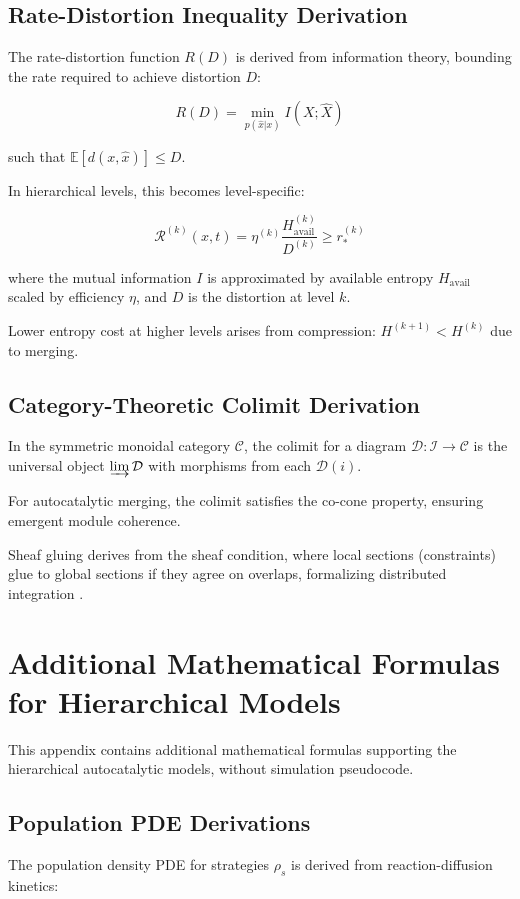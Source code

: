 \documentclass[openany]{book}
\begin{document}
\section{Rate-Distortion Inequality Derivation}
The rate-distortion function $R(D)$ is derived from information theory, bounding the rate required to achieve distortion $D$:

\[R(D) = \min_{p(\hat{x}|x)} I(X; \hat{X})\]

such that $\mathbb{E}[d(x, \hat{x})] \le D$.

In hierarchical levels, this becomes level-specific:

\[ \mathcal{R}^{(k)}(x,t) = \eta^{(k)} \frac{H^{(k)}_{\mathrm{avail}}}{D^{(k)}} \ge r_\ast^{(k)} \]

where the mutual information $I$ is approximated by available entropy $H_{\mathrm{avail}}$ scaled by efficiency $\eta$, and $D$ is the distortion at level $k$.

Lower entropy cost at higher levels arises from compression: $H^{(k+1)} < H^{(k)}$ due to merging.

\section{Category-Theoretic Colimit Derivation}
In the symmetric monoidal category $\mathcal{C}$, the colimit for a diagram $\mathcal{D}: \mathcal{I} \to \mathcal{C}$ is the universal object $\varinjlim \mathcal{D}$ with morphisms from each $\mathcal{D}(i)$.

For autocatalytic merging, the colimit satisfies the co-cone property, ensuring emergent module coherence.

Sheaf gluing derives from the sheaf condition, where local sections (constraints) glue to global sections if they agree on overlaps, formalizing distributed integration \citep{steel2013}.

\chapter{Additional Mathematical Formulas for Hierarchical Models}
This appendix contains additional mathematical formulas supporting the hierarchical autocatalytic models, without simulation pseudocode.

\section{Population PDE Derivations}
The population density PDE for strategies $\rho_s$ is derived from reaction-diffusion kinetics:
\end{document}
